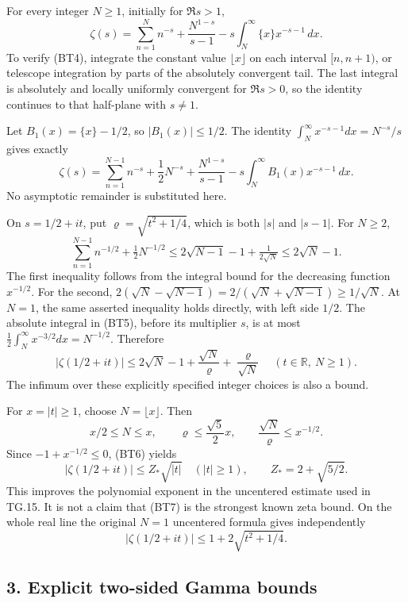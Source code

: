 For every integer \(N\ge1\), initially for \(\Re s>1\), \[
\zeta(s)=\sum_{n=1}^{N}n^{-s}
 +\frac{N^{1-s}}{s-1}
 -s\int_N^\infty \{x\}x^{-s-1}\,dx.
\tag{BT4}
\] To verify (BT4), integrate the constant value \(\lfloor x\rfloor\) on each interval \([n,n+1)\), or telescope integration by parts of the absolutely convergent tail. The last integral is absolutely and locally uniformly convergent for \(\Re s>0\), so the identity continues to that half-plane with \(s\ne1\).

Let \(B_1(x)=\{x\}-1/2\), so \(|B_1(x)|\le1/2\). The identity \(\int_N^\infty x^{-s-1}dx=N^{-s}/s\) gives exactly \[
\zeta(s)=\sum_{n=1}^{N-1}n^{-s}+\frac12N^{-s}
 +\frac{N^{1-s}}{s-1}
 -s\int_N^\infty B_1(x)x^{-s-1}\,dx.
\tag{BT5}
\] No asymptotic remainder is substituted here.

On \(s=1/2+it\), put \(\varrho=\sqrt{t^2+1/4}\), which is both \(|s|\) and \(|s-1|\). For \(N\ge2\), \[
\sum_{n=1}^{N-1}n^{-1/2}+\tfrac12N^{-1/2}
\le 2\sqrt{N-1}-1+\tfrac1{2\sqrt N}
\le 2\sqrt N-1.
\] The first inequality follows from the integral bound for the decreasing function \(x^{-1/2}\). For the second, \(2(\sqrt N-\sqrt{N-1})=2/(\sqrt N+\sqrt{N-1})\ge1/\sqrt N\). At \(N=1\), the same asserted inequality holds directly, with left side \(1/2\). The absolute integral in (BT5), before its multiplier \(s\), is at most \(\tfrac12\int_N^\infty x^{-3/2}dx=N^{-1/2}\). Therefore \[
|\zeta(1/2+it)|
\le 2\sqrt N-1+\frac{\sqrt N}{\varrho}
                       +\frac{\varrho}{\sqrt N}
\quad(t\in\mathbb{R},\ N\ge1).
\tag{BT6}
\] The infimum over these explicitly specified integer choices is also a bound.

For \(x=|t|\ge1\), choose \(N=\lfloor x\rfloor\). Then \[
x/2\le N\le x,\qquad
\varrho\le\frac{\sqrt5}{2}x,\qquad
\frac{\sqrt N}{\varrho}\le x^{-1/2}.
\] Since \(-1+x^{-1/2}\le0\), (BT6) yields \[
\boxed{|\zeta(1/2+it)|\le Z_*\sqrt{|t|}\quad(|t|\ge1),
\qquad Z_*=2+\sqrt{5/2}.}
\tag{BT7}
\] This improves the polynomial exponent in the uncentered estimate used in TG.15. It is not a claim that (BT7) is the strongest known zeta bound. On the whole real line the original \(N=1\) uncentered formula gives independently \[
|\zeta(1/2+it)|\le 1+2\sqrt{t^2+1/4}.
\tag{BT8}
\]

\subsection{3. Explicit two-sided Gamma bounds}\label{GraphV2:explicit-two-sided-gamma-bounds}

